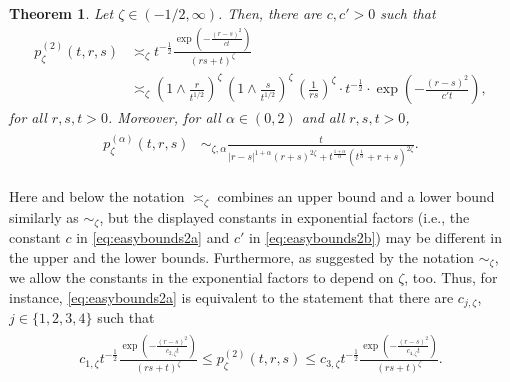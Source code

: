 \documentclass[12pt,reqno,a4paper]{amsart}
\newtheorem{theorem}{Theorem}[section]
\theoremstyle{definition}
\theoremstyle{remark}
\numberwithin{equation}{section}
\newcommand{\1}{\mathbbm{1}}
\def\gb{\mathfrak{B}}
\begin{document}
  





\begin{theorem}
  \label{heatkernelalpha1subordinatedboundsfinal}
  Let $\zeta\in(-1/2,\infty)$.
  Then, there are $c,c'>0$ such that
  \begin{subequations}
    \label{eq:easybounds2}
    \begin{align}
      p_\zeta^{(2)}(t,r,s)
      \label{eq:easybounds2a}
      & \asymp_\zeta t^{-\frac12}\frac{\exp\left(-\frac{(r-s)^2}{c t}\right)}{(rs+t)^{\zeta}} \\
      \label{eq:easybounds2b}
      & \asymp_\zeta \left(1\wedge\frac{r}{t^{1/2}}\right)^{\zeta}\, \left(1\wedge\frac{s}{t^{1/2}}\right)^{\zeta}\,\left(\frac{1}{rs}\right)^{\zeta} \cdot t^{-\frac12} \cdot \exp\left(-\frac{(r-s)^2}{c' t}\right),
    \end{align}
  \end{subequations}\index{$\asymp$}for all $r,s,t>0$. Moreover, for all $\alpha\in(0,2)$ and all $r,s,t>0$,
  \begin{align}
    \label{eq:heatkernelalpha1weightedsubordinatedboundsfinal}
    \begin{split}
      p_\zeta^{(\alpha)}(t,r,s)
      & \sim_{\zeta,\alpha} \frac{t}{|r-s|^{1+\alpha}(r+s)^{2\zeta} + t^{\frac{1+\alpha}{\alpha}}(t^{\frac1\alpha}+r+s)^{2\zeta}}.
    \end{split}
  \end{align}
\end{theorem}

Here and below the notation $\asymp_\zeta$ combines an upper bound and a lower bound similarly as $\sim_\zeta$, but the displayed constants in exponential factors (i.e., the constant $c$ in \eqref{eq:easybounds2a} and $c'$ in \eqref{eq:easybounds2b}) may be different in the upper and the lower bounds. Furthermore, as suggested by the notation $\sim_\zeta$, we allow the constants in the exponential factors to depend on $\zeta$, too. Thus, for instance, \eqref{eq:easybounds2a} is equivalent to the statement that there are $c_{j,\zeta}$, $j\in\{1,2,3,4\}$ such that
\begin{align}
  \begin{split}
    c_{1,\zeta} t^{-\frac12}\frac{\exp\left(-\frac{(r-s)^2}{c_{2,\zeta} t}\right)}{(rs+t)^{\zeta}}
    \leq p_\zeta^{(2)}(t,r,s)
    \leq c_{3,\zeta} t^{-\frac12}\frac{\exp\left(-\frac{(r-s)^2}{c_{4,\zeta} t}\right)}{(rs+t)^{\zeta}}.
  \end{split}
\end{align}
\end{document}
